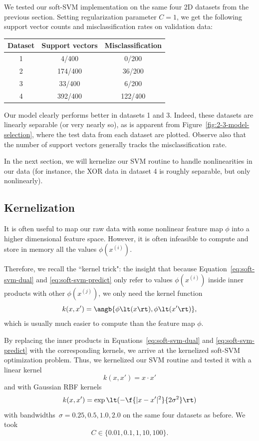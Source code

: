 \documentclass{article}
\newcommand{\sind}[1]{^{(#1)}}
\begin{document}
\begin{multicols}{2}
We tested our soft-SVM implementation
on the same four 2D datasets from the previous section.
Setting regularization parameter $C=1$,
we get the following support vector counts
and misclassification rates on validation data:

\begin{center}
\begin{tabular}{|c|c|c|}
\hline
Dataset & Support vectors & Misclassification \\\hline
1 & 4/400 & 0/200 \\
2 & 174/400 & 36/200 \\
3 & 33/400 & 6/200 \\
4 & 392/400 & 122/400\\\hline
\end{tabular}
\end{center}

Our model clearly performs better in datasets 1 and 3.
Indeed, these datasets are linearly separable (or very nearly so),
as is apparent from Figure~\ref{fig:2-3-model-selection},
where the test data from each dataset are plotted.
Observe also that the number of support vectors
generally tracks the misclassification rate.

In the next section, we will kernelize our SVM routine
to handle nonlinearities in our data
(for instance, the XOR data in dataset 4 is roughly separable, but only nonlinearly).



\subsection{Kernelization}
\label{subsec:kernelization}

It is often useful to map our raw data
with some nonlinear feature map $\phi$
into a higher dimensional feature space.
However, it is often infeasible to compute and store in memory
all the values $\phi(x\sind{i})$.

Therefore, we recall the ``kernel trick": the insight that
because Equation~\ref{eq:soft-svm-dual} and \ref{eq:soft-svm-predict}
only refer to values $\phi(x\sind{i})$ inside inner products
with other $\phi(x\sind{j})$,
we only need the kernel function
\begin{equation}
    k(x, x') = \angb{\phi\lt(x\rt), \phi\lt(x'\rt)},
\end{equation}
which is usually much easier to compute than the feature map $\phi$.

By replacing the inner products in
Equations~\ref{eq:soft-svm-dual} and \ref{eq:soft-svm-predict}
with the corresponding kernels,
we arrive at the kernelized soft-SVM optimization problem.
Thus, we kernelized our SVM routine
and tested it with a linear kernel
\begin{equation}
    k(x, x') = x\cdot x'
\end{equation}
and with Gaussian RBF kernels
\begin{equation}\label{eq:2-2-gaussian-rbf}
    k(x, x') = \exp\lt(-\f{|x - x'|^2}{2\sigma^2}\rt)
\end{equation}
with bandwidths~$\sigma=0.25,0.5,1.0,2.0$ on the same four datasets as before.
We took
\[
    C \in \{0.01, 0.1, 1, 10, 100\}.
\]


\end{multicols}
\end{document}
